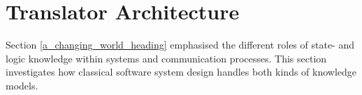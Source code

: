 %
%
%
%
%
%
%

\section{Translator Architecture}
\label{translator_architecture_heading}

Section \ref{a_changing_world_heading} emphasised the different roles of state-
and logic knowledge within systems and communication processes. This section
investigates how classical software system design handles both kinds of
knowledge models.






%
%
